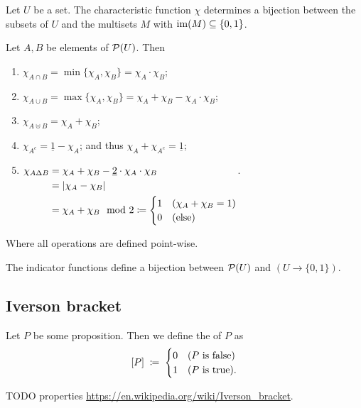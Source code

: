\begin{lemma}
Let $U$ be a set. The characteristic function $\chi$ determines a bijection between the subsets of $U$ and the multisets $M$ with $\operatorname{im}(M)\subseteq \{0,1\}$.
\end{lemma}

\begin{lemma}
Let $A,B$ be elements of $\operatorname{\mathcal{P}}(U)$. Then
\begin{enumerate}
\item $\chi_{A\cap B} = \min\{\chi_A,\chi_B\} = \chi_A\cdot \chi_B$;
\item $\chi_{A\cup B} = \max\{\chi_A,\chi_B\} = \chi_A + \chi_B - \chi_A\cdot \chi_B$;
\item $\chi_{A\uplus B} = \chi_A + \chi_B$;
\item $\chi_{A^c} = \underline{1}-\chi_A$; and thus $\chi_A + \chi_{A^c} = \underline{1}$;
\item $\chi_{A\Delta B} \begin{aligned}[t] &= \chi_A + \chi_B - \underline{2}\cdot\chi_A\cdot \chi_B \\
&= |\chi_A - \chi_B| \\
&= \chi_A + \chi_B \mod 2 \coloneqq \begin{cases}
1 & (\chi_A + \chi_B = 1) \\
0 & \text{(else)}
\end{cases}
\end{aligned}$.
\end{enumerate}
Where all operations are defined point-wise.
\end{lemma}

\begin{proposition}
The indicator functions define a bijection between $\operatorname{\mathcal{P}}(U)$ and $(U\to \{0,1\})$.
\end{proposition}

\subsection{Iverson bracket}
\begin{definition}
Let $P$ be some proposition. Then we define the  of $P$ as
\[ \Iverson{P} \;\defeq\; \begin{cases}
0 & (\text{$P$ is false}) \\
1 & (\text{$P$ is true}).
\end{cases} \]
\end{definition}

TODO properties \url{https://en.wikipedia.org/wiki/Iverson_bracket}.

